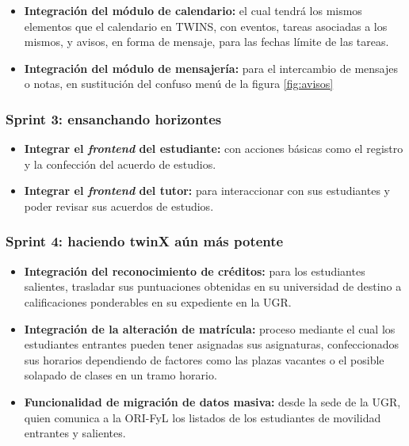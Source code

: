 \begin{itemize}
	\item \textbf{Integración del módulo de calendario:} el cual tendrá los mismos elementos que el calendario en TWINS, con eventos, tareas asociadas a los mismos, y avisos, en forma de mensaje, para las fechas límite de las tareas.
	\item \textbf{Integración del módulo de mensajería:} para el intercambio de mensajes o notas, en sustitución del confuso menú de la figura \ref{fig:avisos}
\end{itemize}

\subsubsection*{\textbf{Sprint 3: ensanchando horizontes}}

\begin{itemize}
	\item \textbf{Integrar el \textit{frontend} del estudiante:} con acciones básicas como el registro y la confección del acuerdo de estudios.
	\item \textbf{Integrar el \textit{frontend} del tutor:} para interaccionar con sus estudiantes y poder revisar sus acuerdos de estudios.
\end{itemize}

\subsubsection*{\textbf{Sprint 4: haciendo twinX aún más potente}}

\begin{itemize}
	\item \textbf{Integración del reconocimiento de créditos:} para los estudiantes salientes, trasladar sus puntuaciones obtenidas en su universidad de destino a calificaciones ponderables en su expediente en la UGR.
	\item \textbf{Integración de la alteración de matrícula:} proceso mediante el cual los estudiantes entrantes pueden tener asignadas sus asignaturas, confeccionados sus horarios dependiendo de factores como las plazas vacantes o el posible solapado de clases en un tramo horario.
	\item \textbf{Funcionalidad de migración de datos masiva:} desde la sede de la UGR, quien comunica a la ORI-FyL los listados de los estudiantes de movilidad entrantes y salientes.
\end{itemize}

